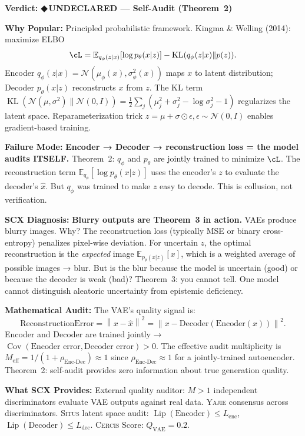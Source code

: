 \documentclass[12pt,a4paper]{article}
\theoremstyle{definition}
\newcommand{\guilty}{{\color{guiltycolor}\textbf{◆\,UNDECLARED}}}
\newcommand{\Situs}{\textsc{Situs}}
\newcommand{\Yajie}{\textsc{Yajie}}
\newcommand{\Cercis}{\textsc{Cercis}}
\DeclareMathOperator{\KL}{KL}
\DeclareMathOperator{\Cov}{Cov}
\DeclareMathOperator{\Lip}{Lip}
\newcommand{\E}{\mathbb{E}}
\newcommand{\cN}{\mathcal{N}}
\newcommand{\norm}[1]{\left\lVert#1\right\rVert}
\newcommand{\auditHeader}[1]{\medskip\noindent\textbf{\large #1}\medskip}
\newcommand{\whyPopular}{\noindent\textbf{Why Popular:} }
\newcommand{\whyFail}{\noindent\textbf{Failure Mode:} }
\newcommand{\whatMissing}{\noindent\textbf{What SCX Provides:} }
\newcommand{\diagnosis}{\noindent\textbf{SCX Diagnosis:} }
\newcommand{\mathAudit}{\noindent\textbf{Mathematical Audit:} }
\begin{document}
\auditHeader{Verdict: \guilty{} — Self-Audit (Theorem~2)}

\whyPopular{} Principled probabilistic framework. Kingma \& Welling (2014): maximize ELBO
\[
\cL = \E_{q_\phi(z|x)}[\log p_\theta(x|z)] - \KL(q_\phi(z|x) \| p(z)).
\]
Encoder $q_\phi(z|x) = \cN(\mu_\phi(x), \sigma_\phi^2(x))$ maps $x$ to latent distribution; Decoder $p_\theta(x|z)$ reconstructs $x$ from $z$. The KL term $\KL(\cN(\mu, \sigma^2) \| \cN(0, I)) = \frac{1}{2}\sum_j (\mu_j^2 + \sigma_j^2 - \log\sigma_j^2 - 1)$ regularizes the latent space. Reparameterization trick $z = \mu + \sigma \odot \epsilon, \epsilon \sim \cN(0, I)$ enables gradient-based training.

\whyFail{} \textbf{Encoder → Decoder → reconstruction loss = the model audits ITSELF.} Theorem~2: $q_\phi$ and $p_\theta$ are jointly trained to minimize $\cL$. The reconstruction term $\E_{q_\phi}[\log p_\theta(x|z)]$ uses the encoder's $z$ to evaluate the decoder's $\hat{x}$. But $q_\phi$ was trained to make $z$ easy to decode. This is collusion, not verification.

\diagnosis{} \textbf{Blurry outputs are Theorem~3 in action.} VAEs produce blurry images. Why? The reconstruction loss (typically MSE or binary cross-entropy) penalizes pixel-wise deviation. For uncertain $z$, the optimal reconstruction is the \textit{expected} image $\E_{p_\theta(x|z)}[x]$, which is a weighted average of possible images → blur. But is the blur because the model is uncertain (good) or because the decoder is weak (bad)? Theorem~3: you cannot tell. One model cannot distinguish aleatoric uncertainty from epistemic deficiency.

\mathAudit{} The VAE's quality signal is:
\[
\text{ReconstructionError} = \norm{x - \hat{x}}^2 = \norm{x - \text{Decoder}(\text{Encoder}(x))}^2.
\]
Encoder and Decoder are trained jointly → $\Cov(\text{Encoder error}, \text{Decoder error}) > 0$. The effective audit multiplicity is $M_{\text{eff}} = 1/(1 + \rho_{\text{Enc-Dec}}) \approx 1$ since $\rho_{\text{Enc-Dec}} \approx 1$ for a jointly-trained autoencoder. Theorem~2: self-audit provides zero information about true generation quality.

\whatMissing{} External quality auditor: $M>1$ independent discriminators evaluate VAE outputs against real data. \Yajie{} consensus across discriminators. \Situs{} latent space audit: $\Lip(\text{Encoder}) \le L_{\text{enc}}$, $\Lip(\text{Decoder}) \le L_{\text{dec}}$. \Cercis{} Score: $Q_{\text{VAE}} = 0.2$.

\end{document}
